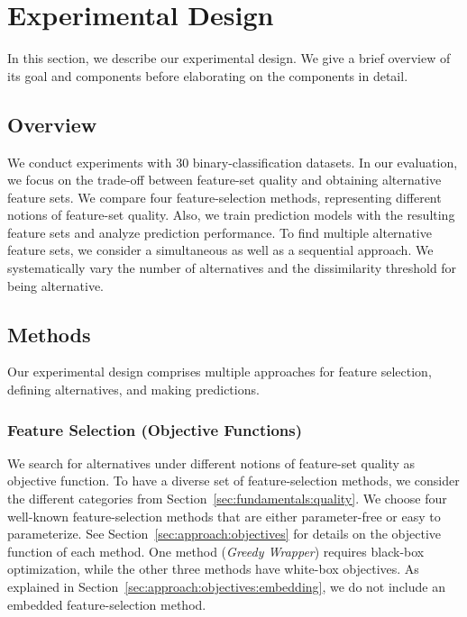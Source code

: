 \documentclass{article}
\theoremstyle{definition}
\begin{document}
\section{Experimental Design}
\label{sec:experimental-design}

In this section, we describe our experimental design.
We give a brief overview of its goal and components before elaborating on the components in detail.

\subsection{Overview}
\label{sec:experimental-design:overview}

We conduct experiments with 30 binary-classification datasets.
In our evaluation, we focus on the trade-off between feature-set quality and obtaining alternative feature sets.
We compare four feature-selection methods, representing different notions of feature-set quality.
Also, we train prediction models with the resulting feature sets and analyze prediction performance.
To find multiple alternative feature sets, we consider a simultaneous as well as a sequential approach.
We systematically vary the number of alternatives and the dissimilarity threshold for being alternative.

\subsection{Methods}
\label{sec:experimental-design:approaches}

Our experimental design comprises multiple approaches for feature selection, defining alternatives, and making predictions.

\subsubsection{Feature Selection (Objective Functions)}
\label{sec:experimental-design:approaches:feature-selection}

We search for alternatives under different notions of feature-set quality as objective function.
To have a diverse set of feature-selection methods, we consider the different categories from Section~\ref{sec:fundamentals:quality}.
We choose four well-known feature-selection methods that are either parameter-free or easy to parameterize.
See Section~\ref{sec:approach:objectives} for details on the objective function of each method.
One method (\emph{Greedy Wrapper}) requires black-box optimization, while the other three methods have white-box objectives.
As explained in Section~\ref{sec:approach:objectives:embedding}, we do not include an embedded feature-selection method.
\end{document}

